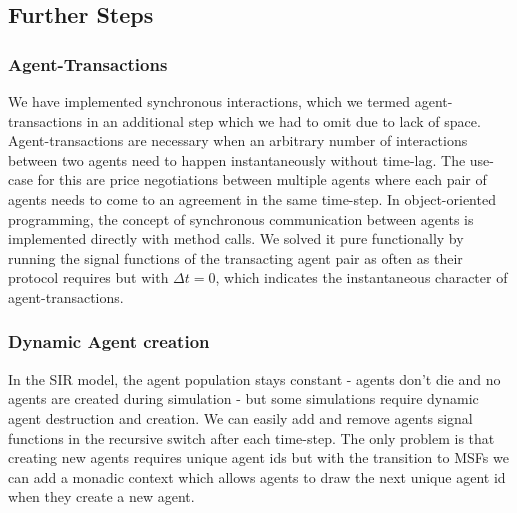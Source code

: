 





\subsection{Further Steps}
\subsubsection{Agent-Transactions}
We have implemented synchronous interactions, which we termed agent-transactions in an additional step which we had to omit due to lack of space. Agent-transactions are necessary when an arbitrary number of interactions between two agents need to happen instantaneously without time-lag. The use-case for this are price negotiations between multiple agents where each pair of agents needs to come to an agreement in the same time-step. In object-oriented programming, the concept of synchronous communication between agents is implemented directly with method calls. We solved it pure functionally by running the signal functions of the transacting agent pair as often as their protocol requires but with $\Delta t=0$, which indicates the instantaneous character of agent-transactions.

\subsubsection{Dynamic Agent creation}
In the SIR model, the agent population stays constant - agents don't die and no agents are created during simulation - but some simulations \cite{epstein_growing_1996} require dynamic agent destruction and creation. We can easily add and remove agents signal functions in the recursive switch after each time-step. The only problem is that creating new agents requires unique agent ids but with the transition to MSFs we can add a monadic context which allows agents to draw the next unique agent id when they create a new agent. %

%